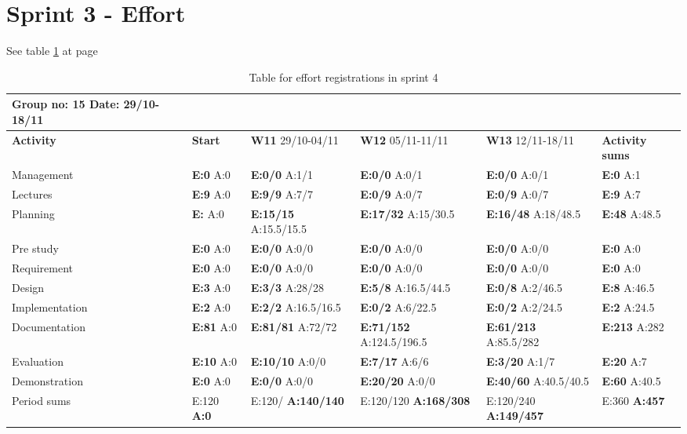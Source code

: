 \section{Sprint 3 - Effort}

See table \ref{tab:effortweekss4} at page \pageref{tab:effortweekss4}

\newpage

\begin{table}[htb]
\begin{tabularx}{\linewidth}{>{\setlength\hsize{.625\hsize}}X|>{\setlength\hsize{0.3\hsize}}X|>{\setlength\hsize{0.5\hsize}}X|>{\setlength\hsize{0.5\hsize}}X|>{\setlength\hsize{0.5\hsize}}X|>{\setlength\hsize{.3\hsize}}X}
Group no: 15 Date: 29/10-18/11  \\ \hline
\textbf{Activity} & \textbf{Start} & \textbf{W11} 29/10-04/11 & \textbf{W12} 05/11-11/11 & \textbf{W13} 12/11-18/11 & \textbf{Activity sums} \\ \hline \hline
Management & \textbf{E:0} A:0 & \textbf{E:0/0} A:1/1 & \textbf{E:0/0} A:0/1 & \textbf{E:0/0} A:0/1 & \textbf{E:0} A:1  \\ \hline
Lectures & \textbf{E:9} A:0 & \textbf{E:9/9} A:7/7 & \textbf{E:0/9} A:0/7 & \textbf{E:0/9} A:0/7 & \textbf{E:9} A:7  \\ \hline
Planning & \textbf{E:} A:0 & \textbf{E:15/15} A:15.5/15.5 & \textbf{E:17/32} A:15/30.5 & \textbf{E:16/48} A:18/48.5 & \textbf{E:48} A:48.5  \\ \hline
Pre study & \textbf{E:0} A:0 & \textbf{E:0/0} A:0/0 & \textbf{E:0/0} A:0/0 & \textbf{E:0/0} A:0/0 & \textbf{E:0} A:0  \\ \hline
Requirement & \textbf{E:0} A:0 & \textbf{E:0/0} A:0/0 & \textbf{E:0/0} A:0/0 & \textbf{E:0/0} A:0/0 & \textbf{E:0} A:0 \\ \hline
Design & \textbf{E:3} A:0 & \textbf{E:3/3} A:28/28 & \textbf{E:5/8} A:16.5/44.5 & \textbf{E:0/8} A:2/46.5 & \textbf{E:8} A:46.5  \\ \hline
Implementation & \textbf{E:2} A:0 & \textbf{E:2/2} A:16.5/16.5 & \textbf{E:0/2} A:6/22.5 & \textbf{E:0/2} A:2/24.5 & \textbf{E:2} A:24.5  \\ \hline
Documentation & \textbf{E:81} A:0 & \textbf{E:81/81} A:72/72 & \textbf{E:71/152} A:124.5/196.5 & \textbf{E:61/213} A:85.5/282 & \textbf{E:213} A:282  \\ \hline
Evaluation & \textbf{E:10} A:0 & \textbf{E:10/10} A:0/0 & \textbf{E:7/17} A:6/6 & \textbf{E:3/20} A:1/7 & \textbf{E:20 } A:7  \\ \hline
Demonstration & \textbf{E:0} A:0 & \textbf{E:0/0} A:0/0 & \textbf{E:20/20} A:0/0 & \textbf{E:40/60} A:40.5/40.5 & \textbf{E:60 } A:40.5  \\ \hline
Period sums & E:120 \textbf{A:0} & E:120/ \textbf{A:140/140} & E:120/120 \textbf{A:168/308} & E:120/240 \textbf{A:149/457} & E:360 \textbf{A:457} \\ \hline
\end{tabularx}

\caption{Table for effort registrations in sprint 4} \label{tab:effortweekss4}
\end{table}

